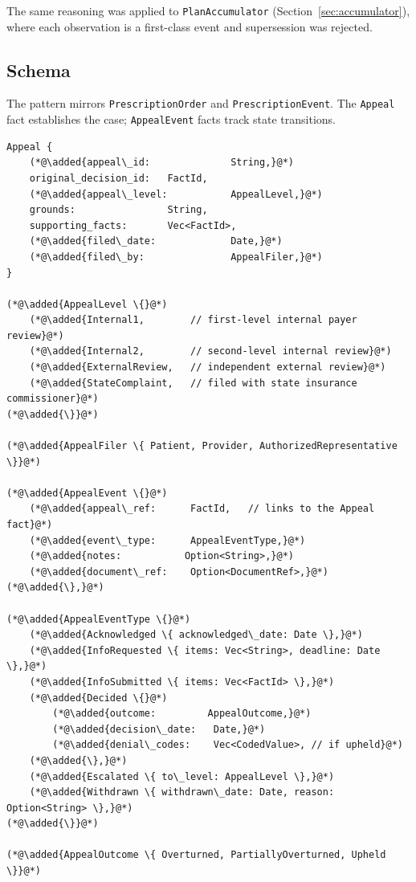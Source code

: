 \documentclass[11pt]{article}
\newcommand{\added}[1]{\textcolor{accentblue}{#1}}
\begin{document}
The same reasoning was applied to \texttt{PlanAccumulator}
(Section~\ref{sec:accumulator}), where each observation is a first-class
event and supersession was rejected.

\subsection{Schema}

The pattern mirrors \texttt{PrescriptionOrder} and
\texttt{PrescriptionEvent}. The \texttt{Appeal} fact establishes the
case; \texttt{AppealEvent} facts track state transitions.

\begin{lstlisting}
Appeal {
    (*@\added{appeal\_id:              String,}@*)
    original_decision_id:   FactId,
    (*@\added{appeal\_level:           AppealLevel,}@*)
    grounds:                String,
    supporting_facts:       Vec<FactId>,
    (*@\added{filed\_date:             Date,}@*)
    (*@\added{filed\_by:               AppealFiler,}@*)
}

(*@\added{AppealLevel \{}@*)
    (*@\added{Internal1,        // first-level internal payer review}@*)
    (*@\added{Internal2,        // second-level internal review}@*)
    (*@\added{ExternalReview,   // independent external review}@*)
    (*@\added{StateComplaint,   // filed with state insurance commissioner}@*)
(*@\added{\}}@*)

(*@\added{AppealFiler \{ Patient, Provider, AuthorizedRepresentative \}}@*)

(*@\added{AppealEvent \{}@*)
    (*@\added{appeal\_ref:      FactId,   // links to the Appeal fact}@*)
    (*@\added{event\_type:      AppealEventType,}@*)
    (*@\added{notes:           Option<String>,}@*)
    (*@\added{document\_ref:    Option<DocumentRef>,}@*)
(*@\added{\},}@*)

(*@\added{AppealEventType \{}@*)
    (*@\added{Acknowledged \{ acknowledged\_date: Date \},}@*)
    (*@\added{InfoRequested \{ items: Vec<String>, deadline: Date \},}@*)
    (*@\added{InfoSubmitted \{ items: Vec<FactId> \},}@*)
    (*@\added{Decided \{}@*)
        (*@\added{outcome:         AppealOutcome,}@*)
        (*@\added{decision\_date:   Date,}@*)
        (*@\added{denial\_codes:    Vec<CodedValue>, // if upheld}@*)
    (*@\added{\},}@*)
    (*@\added{Escalated \{ to\_level: AppealLevel \},}@*)
    (*@\added{Withdrawn \{ withdrawn\_date: Date, reason: Option<String> \},}@*)
(*@\added{\}}@*)

(*@\added{AppealOutcome \{ Overturned, PartiallyOverturned, Upheld \}}@*)
\end{lstlisting}
\end{document}
